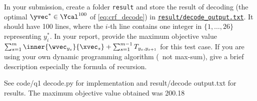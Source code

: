 \documentclass[11pt]{report}
\begin{document}
\begin{itemize}
	\begin{center}
	\end{center}
	
	In your submission, create a folder \verb#result# and store the result of decoding (the optimal $\yvec^* \in \Ycal^{100}$ of \eqref{eq:crf_decode}) in \underline{\texttt{result/decode\_output.txt}}.
	It should have 100 lines,
	where the $i$-th line contains one integer in $\{1,\ldots,26\}$ representing $y^*_i$.
	In your report, provide the maximum objective value $\sum_{s=1}^m \inner{\wvec_{y_s}}{\xvec_s} + \sum_{s=1}^{m-1} T_{y_s, y_{s+1}}$ for this test case.
	If you are using your own dynamic programming algorithm (\ie\ not max-sum),
	give a brief description especially the formula of recursion.

	\textcolor{b}{See code/q1 decode.py for implementation and result/decode output.txt for results. The maximum objective value obtained was 200.18}
\end{itemize}

%
%
%
%
%
%
%
\end{document}
